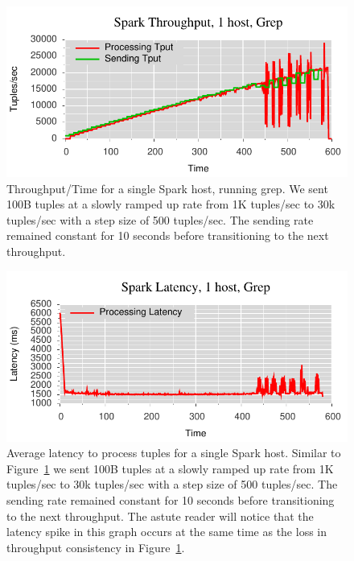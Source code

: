 \begin{figure}[t]
\centering
\includegraphics[width=1\linewidth]{figures/sp2_tput.pdf}
\caption{Throughput/Time for a single Spark host, running grep. We sent 100B tuples at a
slowly ramped up rate from 1K tuples/sec to 30k tuples/sec with a step size of
500 tuples/sec. The sending rate remained constant for 10 seconds before
transitioning to the next throughput.}
\label{fig:sb1-tput}
\end{figure}

\begin{figure}[t]
\centering
\includegraphics[width=1\linewidth]{figures/sp2_latency.pdf}
\caption{Average latency to process tuples for a single Spark host. Similar to
Figure~\ref{fig:sb1-tput} we sent 100B tuples at a slowly ramped up rate from 1K
tuples/sec to 30k tuples/sec with a step size of 500 tuples/sec. The sending
rate remained constant for 10 seconds before transitioning to the next
throughput. The astute reader will notice that the latency spike in this graph
occurs at the same time as the loss in throughput consistency in
Figure~\ref{fig:sb1-tput}.}
\label{fig:label-me-if-you-want}
\end{figure}



